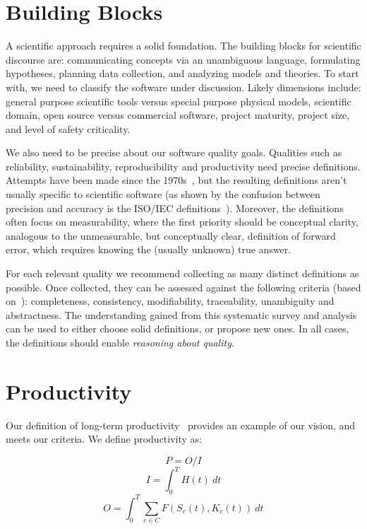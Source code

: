 \documentclass[sigconf, authorversion, nonacm]{acmart}
\begin{document}
\section{Building Blocks}

A scientific approach requires a solid foundation.  The building blocks for
scientific discourse are: communicating concepts via an unambiguous language,
formulating hypotheses, planning data collection, and analyzing models and
theories.  To start with, we need to classify the software under discussion.
Likely dimensions include: general purpose scientific tools versus special
purpose physical models, scientific domain, open source versus commercial
software, project maturity, project size, and level of safety criticality.

We also need to be precise about our software quality goals. Qualities
such as reliability, sustainability, reproducibility and productivity need
precise definitions. Attempts have been made since the
1970s~\cite{McCallEtAl1977}, but the resulting definitions aren't usually
specific to scientific software (as shown by the confusion between precision
and accuracy is the ISO/IEC definitions~\cite{ISO9126}). Moreover, the
definitions often focus on measurability, where the first priority should be
conceptual clarity, analogous to the unmeasurable, but conceptually clear,
definition of forward error, which requires knowing the (usually unknown) true
answer.

For each relevant quality we recommend collecting as many distinct
definitions as possible.  Once collected, they can be
assessed against the following criteria (based on~\citet{IEEE1998}):
completeness, consistency, modifiability, traceability, unambiguity and
abstractness. The understanding gained from this systematic survey and analysis
can be used to either choose solid definitions, or propose new ones.
In all cases, the definitions should enable \emph{reasoning about quality}.

\section{Productivity}

Our definition of long-term productivity~\cite{SmithAndCarette2020arXiv}
provides an example of our vision, and meets our criteria.
We define productivity as:

$$P = O / I$$ 
$$ I = \int_{0}^{T} H(t)\ dt $$
$$ O = \int_{0}^{T} \sum_{c \in C} F(S_c(t), K_c(t))\ dt $$
\end{document}
